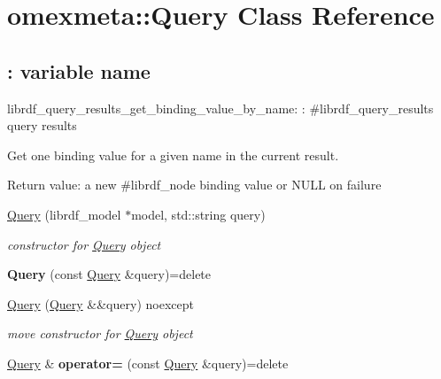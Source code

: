\hypertarget{classomexmeta_1_1Query}{}\section{omexmeta\+:\+:Query Class Reference}
\label{classomexmeta_1_1Query}
\subsection*{\+: variable name}
\label{_amgrp7ca1d8b10bb02d408ac42bd6ecaaf12b}%
librdf\+\_\+query\+\_\+results\+\_\+get\+\_\+binding\+\_\+value\+\_\+by\+\_\+name\+: \+: \#librdf\+\_\+query\+\_\+results query results

Get one binding value for a given name in the current result.

Return value\+: a new \#librdf\+\_\+node binding value or N\+U\+LL on failure \begin{DoxyCompactItemize}
\item 
\mbox{\label{classomexmeta_1_1Query_a405a2bcace57e7b9a78b42ff0bb04a27}} 
\hyperlink{classomexmeta_1_1Query_a405a2bcace57e7b9a78b42ff0bb04a27}{Query} (librdf\+\_\+model $\ast$model, std\+::string query)
\begin{DoxyCompactList}\small\item\em constructor for \hyperlink{classomexmeta_1_1Query}{Query} object \end{DoxyCompactList}\item 
\mbox{\label{classomexmeta_1_1Query_a3f9ff18a0ed6a389104ca76d41119739}} 
{\bfseries Query} (const \hyperlink{classomexmeta_1_1Query}{Query} \&query)=delete
\item 
\mbox{\label{classomexmeta_1_1Query_a6162664ef9a36b453a3b96e913356996}} 
\hyperlink{classomexmeta_1_1Query_a6162664ef9a36b453a3b96e913356996}{Query} (\hyperlink{classomexmeta_1_1Query}{Query} \&\&query) noexcept
\begin{DoxyCompactList}\small\item\em move constructor for \hyperlink{classomexmeta_1_1Query}{Query} object \end{DoxyCompactList}\item 
\mbox{\label{classomexmeta_1_1Query_afd53f231969232188218cae148aa6482}} 
\hyperlink{classomexmeta_1_1Query}{Query} \& {\bfseries operator=} (const \hyperlink{classomexmeta_1_1Query}{Query} \&query)=delete

\end{DoxyCompactItemize}
